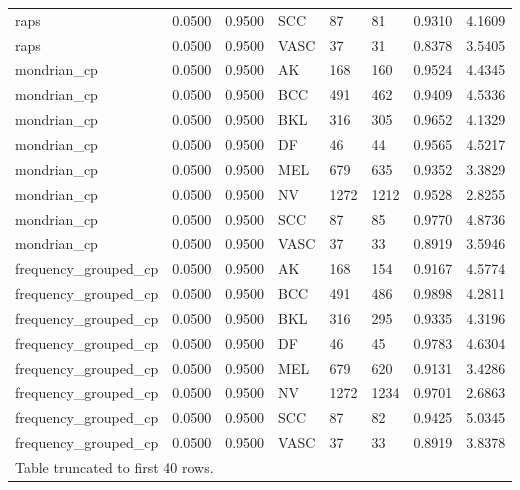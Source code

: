 \begin{table}[htbp]
\begin{tabular}{llllllll}
raps & 0.0500 & 0.9500 & SCC & 87 & 81 & 0.9310 & 4.1609 \\
raps & 0.0500 & 0.9500 & VASC & 37 & 31 & 0.8378 & 3.5405 \\
mondrian\_cp & 0.0500 & 0.9500 & AK & 168 & 160 & 0.9524 & 4.4345 \\
mondrian\_cp & 0.0500 & 0.9500 & BCC & 491 & 462 & 0.9409 & 4.5336 \\
mondrian\_cp & 0.0500 & 0.9500 & BKL & 316 & 305 & 0.9652 & 4.1329 \\
mondrian\_cp & 0.0500 & 0.9500 & DF & 46 & 44 & 0.9565 & 4.5217 \\
mondrian\_cp & 0.0500 & 0.9500 & MEL & 679 & 635 & 0.9352 & 3.3829 \\
mondrian\_cp & 0.0500 & 0.9500 & NV & 1272 & 1212 & 0.9528 & 2.8255 \\
mondrian\_cp & 0.0500 & 0.9500 & SCC & 87 & 85 & 0.9770 & 4.8736 \\
mondrian\_cp & 0.0500 & 0.9500 & VASC & 37 & 33 & 0.8919 & 3.5946 \\
frequency\_grouped\_cp & 0.0500 & 0.9500 & AK & 168 & 154 & 0.9167 & 4.5774 \\
frequency\_grouped\_cp & 0.0500 & 0.9500 & BCC & 491 & 486 & 0.9898 & 4.2811 \\
frequency\_grouped\_cp & 0.0500 & 0.9500 & BKL & 316 & 295 & 0.9335 & 4.3196 \\
frequency\_grouped\_cp & 0.0500 & 0.9500 & DF & 46 & 45 & 0.9783 & 4.6304 \\
frequency\_grouped\_cp & 0.0500 & 0.9500 & MEL & 679 & 620 & 0.9131 & 3.4286 \\
frequency\_grouped\_cp & 0.0500 & 0.9500 & NV & 1272 & 1234 & 0.9701 & 2.6863 \\
frequency\_grouped\_cp & 0.0500 & 0.9500 & SCC & 87 & 82 & 0.9425 & 5.0345 \\
frequency\_grouped\_cp & 0.0500 & 0.9500 & VASC & 37 & 33 & 0.8919 & 3.8378 \\
\multicolumn{8}{l}{Table truncated to first 40 rows.} \\
\hline
\end{tabular}
\end{table}
